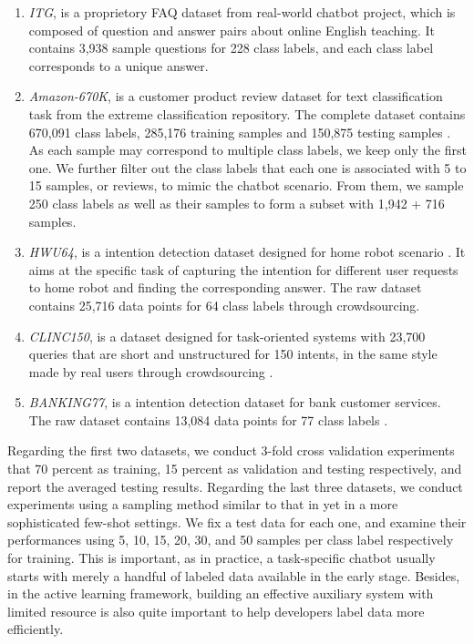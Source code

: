 \documentclass[letterpaper]{article} %
\begin{document}
  \begin{enumerate}
    \item \emph{ITG},  is  a proprietory FAQ dataset from real-world
    chatbot  project,  which is composed of question and answer pairs about online
    English teaching. It contains 3,938 sample questions for 228 class labels, and
    each class label corresponds to a unique answer.

    \item \emph{Amazon-670K}, is a customer product review dataset for
    text  classification  task  from  the  extreme  classification repository. The
    complete  dataset  contains 670,091 class labels, 285,176 training samples and
    150,875   testing   samples   \cite{bhatia2016extreme}.  As  each  sample  may
    correspond  to  multiple  class labels, we keep only the first one. We further
    filter  out the class labels that each one is associated with 5 to 15 samples,
    or  reviews,  to  mimic  the  chatbot scenario. From them, we sample 250 class
    labels as well as their samples to form a subset with 1,942 + 716 samples.

    \item \emph{HWU64}, is a intention detection dataset designed for
    home  robot  scenario \cite{liu2019benchmarking}. It aims at the specific task
    of  capturing  the  intention  for  different  user requests to home robot and
    finding  the corresponding answer. The raw dataset contains 25,716 data points
    for 64 class labels through crowdsourcing.

    \item \emph{CLINC150},  is  a dataset designed for task-oriented
    systems  with  23,700 queries that are short and unstructured for 150 intents,
    in    the    same   style   made   by   real   users   through   crowdsourcing
    \cite{larson2019evaluation}.

    \item \emph{BANKING77}, is a intention detection dataset for bank
    customer  services.  The  raw dataset contains 13,084 data points for 77 class
    labels \cite{casanueva2020efficient}.
  \end{enumerate}

  Regarding  the first two datasets, we conduct 3-fold cross validation experiments
  that   70   percent   as  training,  15  percent  as  validation  and  testing
  respectively,  and  report  the  averaged  testing results. Regarding the last
  three datasets, we conduct experiments using a sampling method similar to that
  in   \cite{casanueva2020efficient}   yet  in  a  more  sophisticated  few-shot
  settings.  We  fix  a  test  data for each one, and examine their performances
  using  5,  10,  15,  20,  30,  and 50 samples per class label respectively for
  training.  This  is important, as in practice, a task-specific chatbot usually
  starts  with  merely  a  handful of labeled data available in the early stage.
  Besides,  in  the  active  learning framework, building an effective auxiliary
  system  with limited resource is also quite important to help developers label
  data more efficiently.
\end{document}
